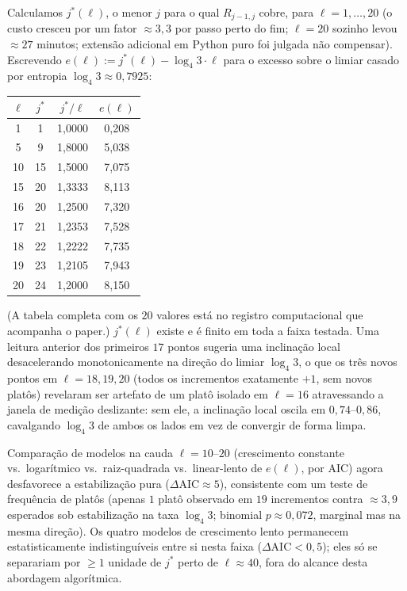 \documentclass[11pt]{article}
\theoremstyle{definition}
\theoremstyle{remark}
\begin{document}
Calculamos $j^\ast(\ell)$, o menor $j$ para o qual $R_{j-1,j}$ cobre,
para $\ell=1,\dots,20$ (o custo cresceu por um fator $\approx 3{,}3$
por passo perto do fim; $\ell=20$ sozinho levou $\approx 27$ minutos;
extensão adicional em Python puro foi julgada não compensar).
Escrevendo $e(\ell):=j^\ast(\ell)-\log_4 3\cdot\ell$ para o excesso
sobre o limiar casado por entropia $\log_4 3\approx 0{,}7925$:

\begin{center}
\begin{tabular}{c|c|c|c}
$\ell$ & $j^\ast$ & $j^\ast/\ell$ & $e(\ell)$ \\ \hline
1 & 1 & 1{,}0000 & 0{,}208 \\
5 & 9 & 1{,}8000 & 5{,}038 \\
10 & 15 & 1{,}5000 & 7{,}075 \\
15 & 20 & 1{,}3333 & 8{,}113 \\
16 & 20 & 1{,}2500 & 7{,}320 \\
17 & 21 & 1{,}2353 & 7{,}528 \\
18 & 22 & 1{,}2222 & 7{,}735 \\
19 & 23 & 1{,}2105 & 7{,}943 \\
20 & 24 & 1{,}2000 & 8{,}150
\end{tabular}
\end{center}

(A tabela completa com os $20$ valores está no registro computacional
que acompanha o paper.) $j^\ast(\ell)$ existe e é finito em toda a
faixa testada. Uma leitura anterior dos primeiros $17$ pontos sugeria
uma inclinação local desacelerando monotonicamente na direção do
limiar $\log_4 3$, o que os três novos pontos em $\ell=18,19,20$
(todos os incrementos exatamente $+1$, sem novos platôs) revelaram ser
artefato de um platô isolado em $\ell=16$ atravessando a janela de
medição deslizante: sem ele, a inclinação local oscila em
$0{,}74$--$0{,}86$, cavalgando $\log_4 3$ de ambos os lados em vez de
convergir de forma limpa.

Comparação de modelos na cauda $\ell=10$--$20$ (crescimento constante
vs.\ logarítmico vs.\ raiz-quadrada vs.\ linear-lento de $e(\ell)$, por
AIC) agora desfavorece a estabilização pura
($\Delta\mathrm{AIC}\approx 5$), consistente com um teste de
frequência de platôs (apenas $1$ platô observado em $19$ incrementos
contra $\approx 3{,}9$ esperados sob estabilização na taxa $\log_4 3$;
binomial $p\approx 0{,}072$, marginal mas na mesma direção). Os quatro
modelos de crescimento lento permanecem estatisticamente
indistinguíveis entre si nesta faixa ($\Delta\mathrm{AIC}<0{,}5$); eles
só se separariam por $\ge 1$ unidade de $j^\ast$ perto de $\ell\approx
40$, fora do alcance desta abordagem algorítmica.
\end{document}

